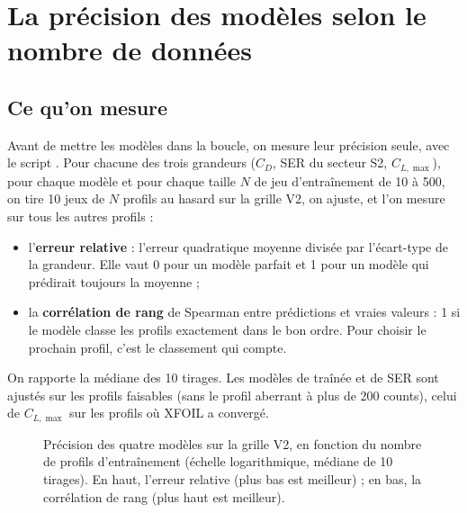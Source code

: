 \chapter{La précision des modèles selon le nombre de données}\label{ch:precision}

\section{Ce qu'on mesure}
Avant de mettre les modèles dans la boucle, on mesure leur précision seule, avec le script . Pour chacune des trois grandeurs ($C_D$, SER du secteur S2, $C_{L,\max}$), pour chaque modèle et pour chaque taille $N$ de jeu d'entraînement de 10 à 500, on tire 10 jeux de $N$ profils au hasard sur la grille V2, on ajuste, et l'on mesure sur tous les autres profils :
\begin{itemize}
\item l'\textbf{erreur relative} : l'erreur quadratique moyenne divisée par l'écart-type de la grandeur. Elle vaut 0 pour un modèle parfait et 1 pour un modèle qui prédirait toujours la moyenne ;
\item la \textbf{corrélation de rang} de Spearman entre prédictions et vraies valeurs : 1 si le modèle classe les profils exactement dans le bon ordre. Pour choisir le prochain profil, c'est le classement qui compte.
\end{itemize}
On rapporte la médiane des 10 tirages. Les modèles de traînée et de SER sont ajustés sur les profils faisables (sans le profil aberrant à plus de 200 counts), celui de $C_{L,\max}$ sur les profils où XFOIL a convergé.

\begin{figure}[htbp]
\centering

\caption{Précision des quatre modèles sur la grille V2, en fonction du nombre de profils d'entraînement (échelle logarithmique, médiane de 10 tirages). En haut, l'erreur relative (plus bas est meilleur) ; en bas, la corrélation de rang (plus haut est meilleur).}\label{fig:precision-v2}
\end{figure}

